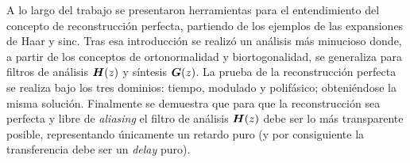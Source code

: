 

	A lo largo del trabajo se presentaron herramientas para el entendimiento del concepto de reconstrucción perfecta, partiendo de los ejemplos de las expansiones de Haar y sinc. Tras esa introducción se realizó un análisis más minucioso donde, a partir de los conceptos de ortonormalidad y biortogonalidad, se generaliza para filtros de análisis $\boldsymbol{H}(z)$ y síntesis $\boldsymbol{G}(z)$. La prueba de la reconstrucción perfecta se realiza bajo los tres dominios: tiempo, modulado y polifásico; obteniéndose la misma solución. Finalmente se demuestra que para que la reconstrucción sea perfecta y libre de \emph{aliasing} el filtro de análisis $\boldsymbol{H}(z)$ debe ser lo más transparente posible, representando únicamente un retardo puro (y por consiguiente la transferencia debe ser un \emph{delay} puro).
